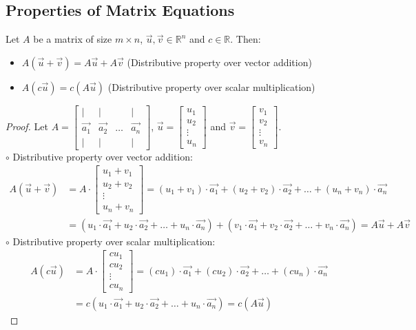 \subsection{Properties of Matrix Equations}
\begin{theorem}
    Let $A$ be a matrix of size $m \times n$, $\vec{u}, \vec{v} \in \mathbb{R}^n$ and $c \in \mathbb{R}$. Then:
    \begin{itemize}[itemsep=1pt,label=$\circ$]
        \item $A(\vec{u} + \vec{v}) = A\vec{u} + A\vec{v}$ (Distributive property over vector addition)
        \item $A(c \vec{u}) = c(A\vec{u})$ (Distributive property over scalar multiplication)
    \end{itemize}
\end{theorem}
\begin{proof}
    Let $A = \begin{bmatrix} | & | & & | \\ \vec{a_1} & \vec{a_2} & \ldots & \vec{a_n} \\ | & | & & | \end{bmatrix}$, $\vec{u} = \begin{bmatrix} u_1 \\ u_2 \\ \vdots \\ u_n \end{bmatrix}$ and $\vec{v} = \begin{bmatrix} v_1 \\ v_2 \\ \vdots \\ v_n \end{bmatrix}$. \\
    $\circ$ Distributive property over vector addition:
    \begin{align*}
        A(\vec{u} + \vec{v}) &= A \cdot \begin{bmatrix} u_1 + v_1 \\ u_2 + v_2 \\ \vdots \\ u_n + v_n \end{bmatrix} = (u_1 + v_1) \cdot \vec{a_1} + (u_2 + v_2) \cdot \vec{a_2} + \ldots + (u_n + v_n) \cdot \vec{a_n} \\
        &= (u_1 \cdot \vec{a_1} + u_2 \cdot \vec{a_2} + \ldots + u_n \cdot \vec{a_n}) + (v_1 \cdot \vec{a_1} + v_2 \cdot \vec{a_2} + \ldots + v_n \cdot \vec{a_n}) = A\vec{u} + A\vec{v}
    \end{align*}
    $\circ$ Distributive property over scalar multiplication:
    \begin{align*}
        A(c \vec{u}) &= A \cdot \begin{bmatrix} c u_1 \\ c u_2 \\ \vdots \\ c u_n \end{bmatrix} = (c u_1) \cdot \vec{a_1} + (c u_2) \cdot \vec{a_2} + \ldots + (c u_n) \cdot \vec{a_n} \\
        &= c (u_1 \cdot \vec{a_1} + u_2 \cdot \vec{a_2} + \ldots + u_n \cdot \vec{a_n}) = c(A\vec{u})
    \end{align*}
\end{proof}


